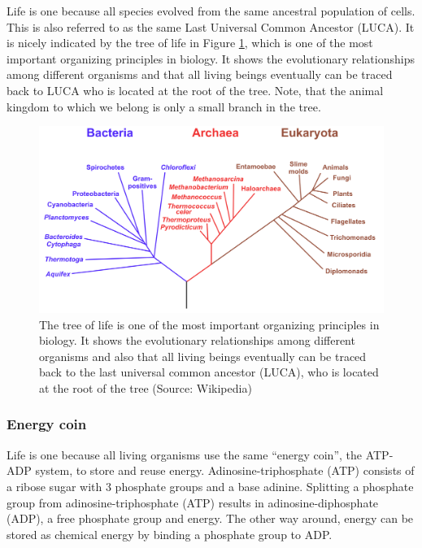 \documentclass[
  11pt,
]{book}
\begin{document}
Life is one because all species evolved from the same ancestral population of cells.
This is also referred to as the same Last Universal Common Ancestor (LUCA). It is nicely indicated by the tree of life in Figure \ref{fig:treeOfLife}, which is one of the most important organizing principles in biology. It shows the evolutionary relationships among different organisms and that all living beings eventually can be traced back to LUCA who is located at the root of the tree. Note, that the animal kingdom to which we belong is only a small branch in the tree.

\begin{figure}

{\centering \includegraphics[width=0.8\linewidth]{./figs/Phylogenetic_tree} 

}

\caption{The tree of life is one of the most important organizing principles in biology. It shows the evolutionary relationships among different organisms and also that all living beings eventually can be traced back to the last universal common ancestor (LUCA), who is located at the root of the tree (Source: Wikipedia)}\label{fig:treeOfLife}
\end{figure}

\newpage

\hypertarget{sectionEnergyCoin}{%
\subsubsection{Energy coin}\label{sectionEnergyCoin}}

Life is one because all living organisms use the same ``energy coin'', the ATP-ADP system, to store and reuse energy.
Adinosine-triphosphate (ATP) consists of a ribose sugar with 3 phosphate groups and a base adinine.
Splitting a phosphate group from adinosine-triphosphate (ATP) results in adinosine-diphosphate (ADP), a free phosphate group and energy.
The other way around, energy can be stored as chemical energy by binding a phosphate group to ADP.
\end{document}
